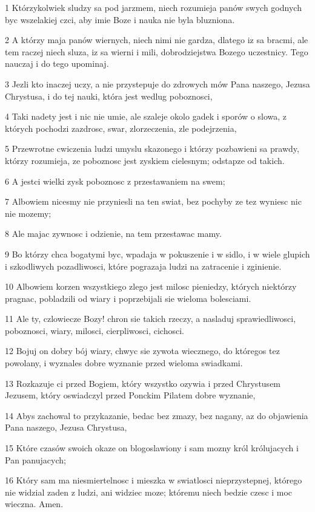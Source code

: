 \par 1 Którzykolwiek sludzy sa pod jarzmem, niech rozumieja panów swych godnych byc wszelakiej czci, aby imie Boze i nauka nie byla bluzniona.
\par 2 A którzy maja panów wiernych, niech nimi nie gardza, dlatego iz sa bracmi, ale tem raczej niech sluza, iz sa wierni i mili, dobrodziejstwa Bozego uczestnicy. Tego nauczaj i do tego upominaj.
\par 3 Jezli kto inaczej uczy, a nie przystepuje do zdrowych mów Pana naszego, Jezusa Chrystusa, i do tej nauki, która jest wedlug poboznosci,
\par 4 Taki nadety jest i nic nie umie, ale szaleje okolo gadek i sporów o slowa, z których pochodzi zazdrosc, swar, zlorzeczenia, zle podejrzenia,
\par 5 Przewrotne cwiczenia ludzi umyslu skazonego i którzy pozbawieni sa prawdy, którzy rozumieja, ze poboznosc jest zyskiem cielesnym; odstapze od takich.
\par 6 A jestci wielki zysk poboznosc z przestawaniem na swem;
\par 7 Albowiem nicesmy nie przyniesli na ten swiat, bez pochyby ze tez wyniesc nic nie mozemy;
\par 8 Ale majac zywnosc i odzienie, na tem przestawac mamy.
\par 9 Bo którzy chca bogatymi byc, wpadaja w pokuszenie i w sidlo, i w wiele glupich i szkodliwych pozadliwosci, które pograzaja ludzi na zatracenie i zginienie.
\par 10 Albowiem korzen wszystkiego zlego jest milosc pieniedzy, których niektórzy pragnac, pobladzili od wiary i poprzebijali sie wieloma bolesciami.
\par 11 Ale ty, czlowiecze Bozy! chron sie takich rzeczy, a nasladuj sprawiedliwosci, poboznosci, wiary, milosci, cierpliwosci, cichosci.
\par 12 Bojuj on dobry bój wiary, chwyc sie zywota wiecznego, do któregos tez powolany, i wyznales dobre wyznanie przed wieloma swiadkami.
\par 13 Rozkazuje ci przed Bogiem, który wszystko ozywia i przed Chrystusem Jezusem, który oswiadczyl przed Ponckim Pilatem dobre wyznanie,
\par 14 Abys zachowal to przykazanie, bedac bez zmazy, bez nagany, az do objawienia Pana naszego, Jezusa Chrystusa,
\par 15 Które czasów swoich okaze on blogoslawiony i sam mozny król królujacych i Pan panujacych;
\par 16 Który sam ma niesmiertelnosc i mieszka w swiatlosci nieprzystepnej, którego nie widzial zaden z ludzi, ani widziec moze; któremu niech bedzie czesc i moc wieczna. Amen.
